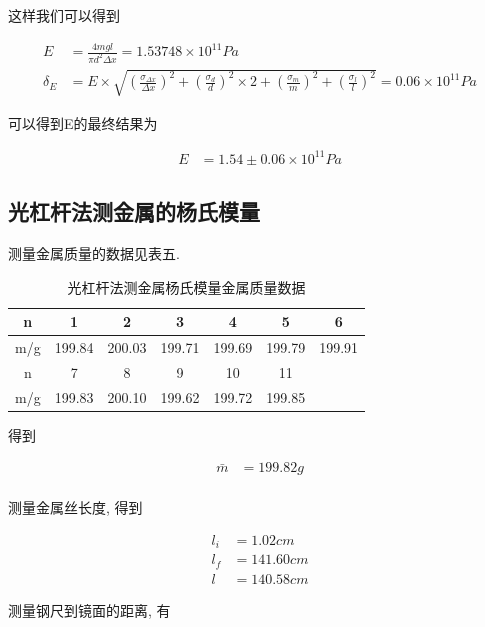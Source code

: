 \documentclass[a4paper,10pt,notitlepage]{article}
\begin{document}
	这样我们可以得到
	
\begin{align*}
	E &= \frac{4mgl}{\pi d^2\Delta x} = 1.53748 \times 10^{11} Pa \\
	\delta_E &= E \times \sqrt{(\frac{\sigma_{\Delta x}}{\Delta x})^2 + (\frac{\sigma_{d}}{d})^2\times 2 + (\frac{\sigma_{m}}{m})^2 + (\frac{\sigma_{l}}{l})^2} = 0.06 \times 10^{11} Pa 
\end{align*}

	可以得到E的最终结果为
	
\begin{align*}
	E &= 1.54 \pm 0.06 \times 10^{11} Pa
\end{align*}

\subsection{光杠杆法测金属的杨氏模量}

	测量金属质量的数据见表五. \\

\begin{center}

	\begin{longtable}{|c|c|c|c|c|c|c|}
	\caption{光杠杆法测金属杨氏模量金属质量数据} \\
	\hline
	n & 1 & 2 & 3 & 4 & 5 & 6 \\
	\hline
	m/g & 199.84 & 200.03 & 199.71 & 199.69 & 199.79 & 199.91 \\
	\hline
	\hline
	n & 7 & 8 & 9 & 10 & 11 &  \\
	\hline
	m/g & 199.83 & 200.10 & 199.62 & 199.72 & 199.85 &  \\
	\hline
	\end{longtable}

\end{center}

	得到
	
\begin{align*}
	\bar{m} &= 199.82g \\
\end{align*}
	
	测量金属丝长度, 得到
	
\begin{align*}
	l_i &= 1.02 cm \\
	l_f &= 141.60 cm \\
	l &= 140.58 cm 
\end{align*}

	测量钢尺到镜面的距离, 有
	
\end{document}

